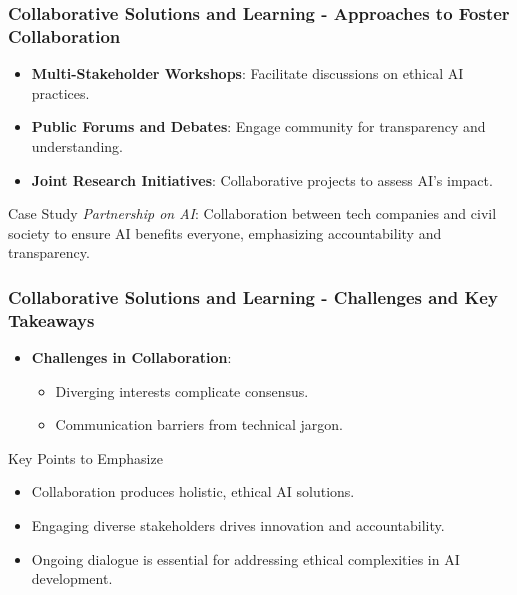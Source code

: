 \documentclass[aspectratio=169]{beamer}
\begin{document}
\begin{frame}[fragile]
    \frametitle{Collaborative Solutions and Learning - Approaches to Foster Collaboration}
    \begin{itemize}
        \item \textbf{Multi-Stakeholder Workshops}: Facilitate discussions on ethical AI practices.
        \item \textbf{Public Forums and Debates}: Engage community for transparency and understanding.
        \item \textbf{Joint Research Initiatives}: Collaborative projects to assess AI's impact.
    \end{itemize}

    \begin{block}{Case Study}
        \textit{Partnership on AI}: Collaboration between tech companies and civil society to ensure AI benefits everyone, emphasizing accountability and transparency.
    \end{block}
\end{frame}

\begin{frame}[fragile]
    \frametitle{Collaborative Solutions and Learning - Challenges and Key Takeaways}
    \begin{itemize}
        \item \textbf{Challenges in Collaboration}:
            \begin{itemize}
                \item Diverging interests complicate consensus.
                \item Communication barriers from technical jargon.
            \end{itemize}
    \end{itemize}

    \begin{block}{Key Points to Emphasize}
        \begin{itemize}
            \item Collaboration produces holistic, ethical AI solutions.
            \item Engaging diverse stakeholders drives innovation and accountability.
            \item Ongoing dialogue is essential for addressing ethical complexities in AI development.
        \end{itemize}
    \end{block}
\end{frame}
\end{document}
